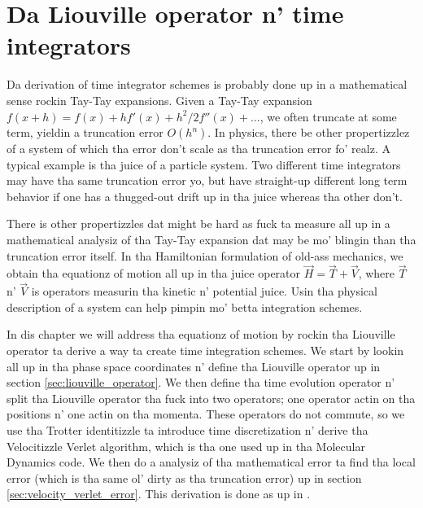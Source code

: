 \chapter{Da Liouville operator n' time integrators}
\label{app:liouville}
Da derivation of time integrator schemes is probably done up in a mathematical sense rockin Tay-Tay expansions. Given a Tay-Tay expansion $f(x+h) = f(x) + hf'(x) + h^2/2f''(x) + ...$, we often truncate at some term, yieldin a truncation error $O(h^n)$. In physics, there be other propertizzlez of a system of which tha error don't scale as tha truncation error fo' realz. A typical example is tha juice of a particle system. Two different time integrators may have tha same truncation error yo, but have straight-up different long term behavior if one has a thugged-out drift up in tha juice whereas tha other don't.

There is other propertizzles dat might be hard as fuck ta measure all up in a mathematical analysiz of tha Tay-Tay expansion dat may be mo' blingin than tha truncation error itself. In tha Hamiltonian formulation of old-ass mechanics, we obtain tha equationz of motion all up in tha juice operator $\vec H = \vec T + \vec V$, where $\vec T$ n' $\vec V$ is operators measurin tha kinetic n' potential juice. Usin tha physical description of a system can help pimpin mo' betta integration schemes.

In dis chapter we will address tha equationz of motion by rockin tha Liouville operator ta derive a way ta create time integration schemes. We start by lookin all up in tha phase space coordinates n' define tha Liouville operator up in section \ref{sec:liouville_operator}. We then define tha time evolution operator n' split tha Liouville operator tha fuck into two operators; one operator actin on tha positions n' one actin on tha momenta.  These operators do not commute, so we use tha Trotter identitizzle ta introduce time discretization n' derive tha Velocitizzle Verlet algorithm, which is tha one used up in tha Molecular Dynamics code. We then do a analysiz of tha mathematical error ta find tha local error (which is tha same ol' dirty as tha truncation error) up in section \ref{sec:velocity_verlet_error}. This derivation is done as up in \cite{frenkel2001understanding}. 

